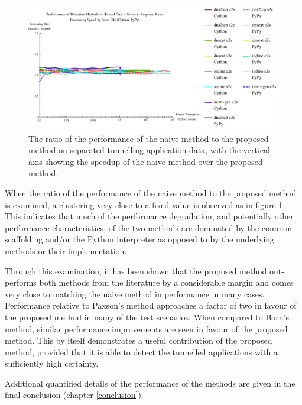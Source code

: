 \documentclass[12pt]{report}
\theoremstyle{remark}
\theoremstyle{definition}
\theoremstyle{definition}
\theoremstyle{definition}
\begin{document}
\begin{figure} \centering
\includegraphics[width=\textwidth]{../figures/ppia-naive2proposed.pdf}
\caption[Performance Ratio of the Naive Method to the Proposed Method on Tunnel
Data by Python Interpreter]{The ratio of the performance of the naive method to
the proposed method on separated tunnelling application data, with the vertical
axis showing the speedup of the naive method over the proposed method.}
\label{ppia-naive2proposed} \end{figure}

When the ratio of the performance of the naive method to the proposed method is
examined, a clustering very close to a fixed value is observed as in figure
\ref{ppia-naive2proposed}. This indicates that much of the performance
degradation, and potentially other performance characteristics, of the two
methods are dominated by the common scaffolding and/or the Python interpreter as
opposed to by the underlying methods or their implementation.

Through this examination, it has been shown that the proposed method
out-performs both methods from the literature by a considerable margin and comes
very close to matching the naive method in performance in many cases.
Performance relative to Paxson's method approaches a factor of two in favour of
the proposed method in many of the test scenarios. When compared to Born's
method, similar performance improvements are seen in favour of the proposed
method. This by itself demonstrates a useful contribution of the proposed
method, provided that it is able to detect the tunnelled applications with a
sufficiently high certainty.

Additional quantified details of the performance of the methods are given in the
final conclusion (chapter \ref{conclusion}).
\end{document}
